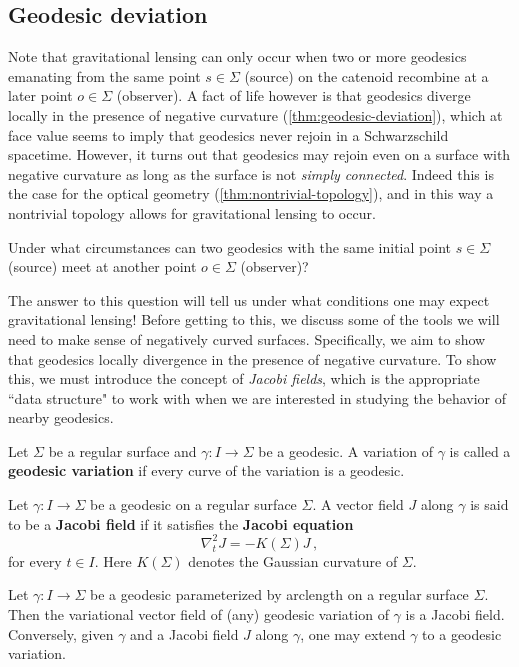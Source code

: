 \subsection{Geodesic deviation}
Note that gravitational lensing can only occur when two or more geodesics emanating from the same point $s \in \Sigma$ (source) on the catenoid recombine at a later point $o \in \Sigma$ (observer).
A fact of life however is that geodesics diverge locally in the presence of negative curvature (\cref{thm:geodesic-deviation}), which at face value seems to imply that geodesics never rejoin in a Schwarzschild spacetime.
However, it turns out that geodesics may rejoin even on a surface with negative curvature as long as the surface is not \textit{simply connected}.
Indeed this is the case for the optical geometry (\cref{thm:nontrivial-topology}), and in this way a nontrivial topology allows for gravitational lensing to occur.
\begin{question}[]\label{}
Under what circumstances can two geodesics with the same initial point $s \in \Sigma$ (source) meet at another point $o \in \Sigma$ (observer)?
\end{question}
The answer to this question will tell us under what conditions one may expect gravitational lensing! Before getting to this, we discuss some of the tools we will need to make sense of negatively curved surfaces. Specifically, we aim to show that geodesics locally divergence in the presence of negative curvature. To show this, we must introduce the concept of \textit{Jacobi fields}, which is the appropriate ``data structure" to work with when we are interested in studying the behavior of nearby geodesics.
\begin{definition}[]\label{}
Let $\Sigma$ be a regular surface and $\gamma: I \to \Sigma$ be a geodesic. A variation of $\gamma$ is called a \textbf{geodesic variation} if every curve of the variation is a geodesic.
\end{definition}
\begin{definition}[]\label{}
Let $\gamma: I \to \Sigma$ be a geodesic on a regular surface $\Sigma$. A vector field $J$ along $\gamma$ is said to be a \textbf{Jacobi field} if it satisfies the \textbf{Jacobi equation}
\begin{equation}\label{}
\nabla^2_t J = -K(\Sigma) J \, ,
\end{equation}
for every $t \in I$. Here $K(\Sigma)$ denotes the Gaussian curvature of $\Sigma$.
\end{definition}
\begin{proposition}[]\label{}
Let $\gamma: I \to \Sigma$ be a geodesic parameterized by arclength on a regular surface $\Sigma$. Then the variational vector field of (any) geodesic variation of $\gamma$ is a Jacobi field. Conversely, given $\gamma$ and a Jacobi field $J$ along $\gamma$, one may extend $\gamma$ to a geodesic variation.
\end{proposition}
